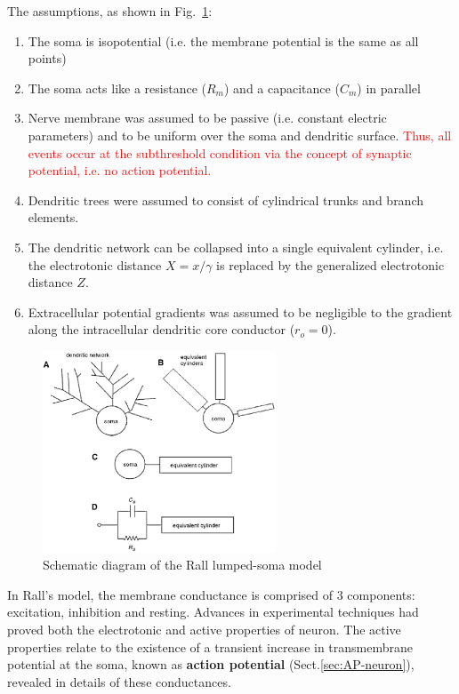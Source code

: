 The assumptions, as shown in Fig.~\ref{fig:rall_lumpedmodel}:
\begin{enumerate}
\item The soma is isopotential (i.e. the membrane potential is the
  same as all points)

\item The soma acts like a resistance ($R_m$) and a capacitance
  ($C_m$) in parallel 

\item Nerve membrane was assumed to be passive (i.e. constant electric
  parameters) and to be uniform over the soma and dendritic
  surface.
  \textcolor{red}{Thus, all events occur at the subthreshold condition
    via the concept of synaptic potential, i.e. no action potential.}

\item Dendritic trees were assumed to consist of cylindrical trunks
  and branch elements. 

\item The dendritic network can be collapsed into a single equivalent
  cylinder, i.e. the electrotonic distance $X=x/\gamma$ is replaced by
  the generalized electrotonic distance $Z$.

\item Extracellular potential gradients was assumed to be negligible
  to the gradient along the intracellular dendritic core conductor
  ($r_o=0$).
\end{enumerate}
\begin{figure}[hbt]
  \centerline{\includegraphics[height=6cm,
    angle=0]{./images/Rall_lumped_model.eps}}
\caption{Schematic diagram of the Rall lumped-soma model}
\label{fig:rall_lumpedmodel}
\end{figure}

In Rall's model, the membrane conductance is comprised of 3 components:
excitation, inhibition and resting.  Advances in experimental techniques had
proved both the electrotonic and active properties of neuron. The active
properties relate to the existence of a transient increase in transmembrane
potential at the soma, known as {\bf action potential}
(Sect.\ref{sec:AP-neuron}), revealed in details of these conductances.

